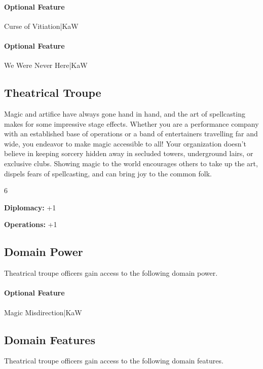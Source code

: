 \documentclass[10pt,a4paper,twoside,bg=print,twocolumn,openany,nodeprecatedcode]{dndbook}
\begin{document}
\paragraph{Optional Feature}
Curse of Vitiation|KaW

\paragraph{Optional Feature}
We Were Never Here|KaW

\subsection{Theatrical Troupe}
Magic and artifice have always gone hand in hand, and the art of spellcasting makes for some impressive stage effects. Whether you are a performance company with an established base of operations or a band of entertainers travelling far and wide, you endeavor to make magic accessible to all! Your organization doesn't believe in keeping sorcery hidden away in secluded towers, underground lairs, or exclusive clubs. Showing magic to the world encourages others to take up the art, dispels fears of spellcasting, and can bring joy to the common folk.

{\par \vspace { 9pt plus 3pt minus 3pt } \noindent  {} \nopagebreak }

\begin{itemize}
\begin{multicols}{6}
\item \textbf{Diplomacy:} +1
\item \textbf{Operations:} +1
\end{multicols}

\end{itemize}

\subsection{Domain Power}
Theatrical troupe officers gain access to the following domain power.

\paragraph{Optional Feature}
Magic Misdirection|KaW

\subsection{Domain Features}
Theatrical troupe officers gain access to the following domain features.
\end{document}
